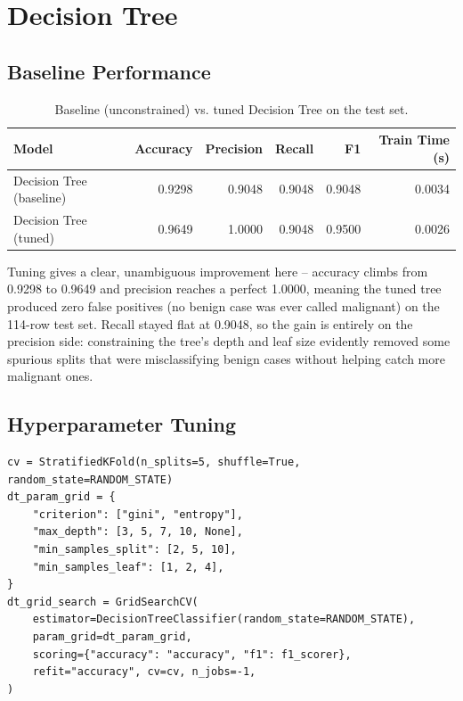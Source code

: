 \documentclass[11pt,a4paper]{article}
\begin{document}
\section{Decision Tree}

\subsection{Baseline Performance}
\begin{table}[h]
\centering
\begin{tabular}{@{}lrrrrr@{}}
\toprule
Model & Accuracy & Precision & Recall & F1 & Train Time (s) \\
\midrule
Decision Tree (baseline) & 0.9298 & 0.9048 & 0.9048 & 0.9048 & 0.0034 \\
Decision Tree (tuned) & 0.9649 & 1.0000 & 0.9048 & 0.9500 & 0.0026 \\
\bottomrule
\end{tabular}
\caption{Baseline (unconstrained) vs. tuned Decision Tree on the test set.}
\end{table}
Tuning gives a clear, unambiguous improvement here -- accuracy climbs from 0.9298 to 0.9649 and precision reaches a perfect 1.0000, meaning the tuned tree produced zero false positives (no benign case was ever called malignant) on the 114-row test set. Recall stayed flat at 0.9048, so the gain is entirely on the precision side: constraining the tree's depth and leaf size evidently removed some spurious splits that were misclassifying benign cases without helping catch more malignant ones.

\subsection{Hyperparameter Tuning}
\begin{lstlisting}
cv = StratifiedKFold(n_splits=5, shuffle=True, random_state=RANDOM_STATE)
dt_param_grid = {
    "criterion": ["gini", "entropy"],
    "max_depth": [3, 5, 7, 10, None],
    "min_samples_split": [2, 5, 10],
    "min_samples_leaf": [1, 2, 4],
}
dt_grid_search = GridSearchCV(
    estimator=DecisionTreeClassifier(random_state=RANDOM_STATE),
    param_grid=dt_param_grid,
    scoring={"accuracy": "accuracy", "f1": f1_scorer},
    refit="accuracy", cv=cv, n_jobs=-1,
)
\end{lstlisting}
\end{document}
